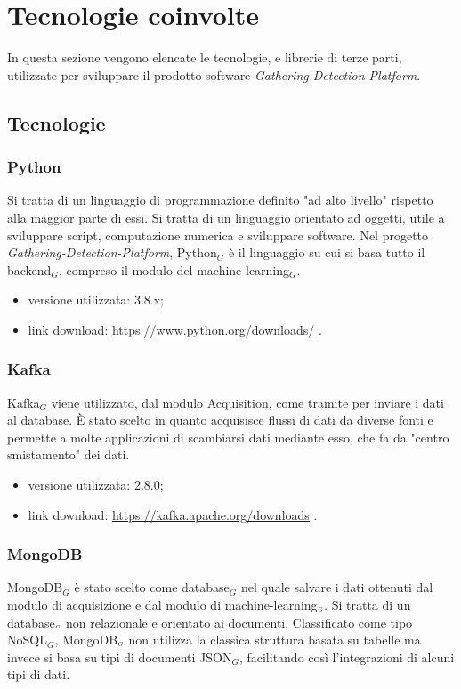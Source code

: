 \chapter{Tecnologie coinvolte}\label{TecnologieCoinvolte}
In questa sezione vengono elencate le tecnologie, e librerie di terze parti, utilizzate per sviluppare il prodotto software \textit{Gathering-Detection-Platform}.

\section{Tecnologie}\label{Tecnologie}
\subsection{Python}\label{TecnologiePython}
Si tratta di un linguaggio di programmazione definito "ad alto livello" rispetto alla maggior parte di essi.
Si tratta di un linguaggio orientato ad oggetti, utile a sviluppare script, computazione numerica e sviluppare software.
Nel progetto \textit{Gathering-Detection-Platform}, Python$_G$ è il linguaggio su cui si basa tutto il backend$_G$, compreso il modulo del machine-learning$_G$.

\begin{itemize}
  \item versione utilizzata: 3.8.x;
  \item link download: \url{https://www.python.org/downloads/} .
\end{itemize}

\subsection{Kafka}\label{TecnologieKafka}
Kafka$_G$ viene utilizzato, dal modulo Acquisition, come tramite per inviare i dati al database.
È stato scelto in quanto acquisisce flussi di dati da diverse fonti e permette a molte applicazioni di scambiarsi dati mediante esso, che fa da "centro smistamento" dei dati.

\begin{itemize}
  \item versione utilizzata: 2.8.0;
  \item link download: \url{https://kafka.apache.org/downloads} .
\end{itemize}

\subsection{MongoDB}\label{TecnologieMongoDB}
MongoDB$_G$ è stato scelto come database$_G$ nel quale salvare i dati ottenuti dal modulo di acquisizione e dal modulo di machine-learning$_{\scaleto{G}{3pt}}$.
Si tratta di un database$_{\scaleto{G}{3pt}}$ non relazionale e orientato ai documenti.
Classificato come tipo NoSQL$_G$, MongoDB$_{\scaleto{G}{3pt}}$ non utilizza la classica struttura basata su tabelle ma invece si basa su tipi di documenti JSON$_G$, facilitando così l'integrazioni di alcuni tipi di dati.

